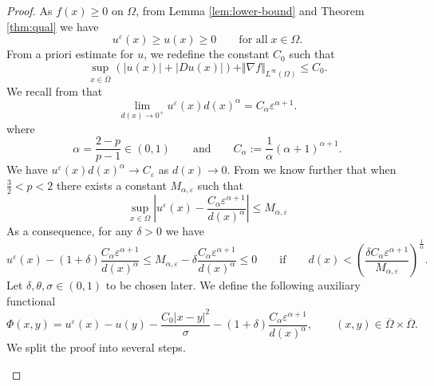 \documentclass[11pt,reqno]{amsart}
\numberwithin{figure}{section}
\theoremstyle{plain}
\theoremstyle{remark}
\numberwithin{equation}{section}
\begin{document}
\begin{proof} As $f(x)\geq 0$ on $\Omega$, from Lemma \ref{lem:lower-bound} and Theorem \ref{thm:qual} we have 
\begin{equation}\label{e:low}
    u^\varepsilon(x) \geq u(x) \geq 0 \qquad\text{for all}\;x\in \Omega.
\end{equation}
From a priori estimate for $u$, we redefine the constant $C_0$ such that
\begin{equation}\label{e:priori}
    \sup_{x\in \overline{\Omega}} \left(\left| u(x)\right| + \left|Du(x)\right|\right) + \Vert \nabla f\Vert_{L^\infty(\Omega)} \leq C_0.
\end{equation}
We recall from \cite{Lasry1989} that
\begin{equation}\label{e:behavior_ueps}
    \lim_{d(x)\to 0^+} u^\varepsilon(x)d(x)^\alpha = C_\alpha \varepsilon^{\alpha+1}.
\end{equation}
where 
\begin{equation*}
    \alpha = \frac{2-p}{p-1} \in (0,1) \qquad\text{and}\qquad C_\alpha := \frac{1}{\alpha}(\alpha+1)^{\alpha+1}.
\end{equation*}
We have $u^\varepsilon (x)d(x)^\alpha \to C_\varepsilon$ as $d(x)\to 0$. From \cite[Theorem II.3]{Lasry1989} we know further that when $\frac{3}{2} < p <2$ there exists a constant $M_{\alpha,\varepsilon}$ such that
\begin{equation}\label{e:blows_up}
    \sup_{x\in \Omega}\left|u^\varepsilon(x) - \frac{C_\alpha \varepsilon^{\alpha+1}}{d(x)^\alpha}\right| \leq M_{\alpha,\varepsilon}
\end{equation}
As a consequence, for any $\delta>0$ we have
\begin{equation*}
    u^\varepsilon(x) - (1+\delta) \frac{C_\alpha \varepsilon^{\alpha+1}}{d(x)^{\alpha}} \leq  M_{\alpha,\varepsilon} - \delta\frac{C_\alpha \varepsilon^{\alpha+1}}{d(x)^{\alpha}}\leq 0 \qquad\text{if}\qquad d(x)< \left(\frac{\delta C_\alpha\varepsilon^{\alpha+1}}{M_{\alpha,\varepsilon}}\right)^{\frac{1}{\alpha}}.
\end{equation*}
Let $\delta,\theta,\sigma\in (0,1)$ to be chosen later. We define the following auxiliary functional
\begin{equation*}
    \Phi(x,y) =  u^\varepsilon(x) - u(y) - \frac{C_0|x-y|^2}{\sigma}- \left(1+\delta\right)\frac{C_\alpha\varepsilon^{\alpha+1}}{d(x)^{\alpha}}, \qquad (x,y)\in \overline{\Omega}\times\overline{\Omega}.
\end{equation*}
We split the proof into several steps.
\begin{enumerate}

\end{enumerate}
\end{proof}
\end{document}
